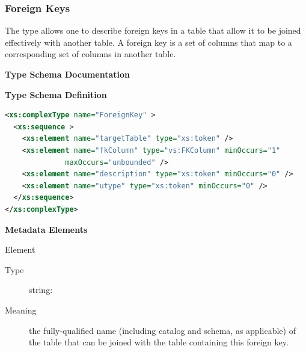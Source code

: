 \documentclass[11pt,a4paper]{ivoa}
\begin{document}
\subsubsection{Foreign Keys}
\label{sect:fkey}


The  type allows one to describe foreign
keys in a table that allow it to be joined effectively with another
table.  A foreign key is a set of columns that map to a corresponding
set of columns in another table.  


\begin{generated}
\begingroup
      	\renewcommand*\descriptionlabel[1]{%
      	\hbox to 5.5em{\emph{#1}\hfil}}\vspace{2ex}\noindent\textbf{ Type Schema Documentation}



\vspace{1ex}\noindent\textbf{ Type Schema Definition}

\begin{lstlisting}[language=XML,basicstyle=\footnotesize]
<xs:complexType name="ForeignKey" >
  <xs:sequence >
    <xs:element name="targetTable" type="xs:token" />
    <xs:element name="fkColumn" type="vs:FKColumn" minOccurs="1"
              maxOccurs="unbounded" />
    <xs:element name="description" type="xs:token" minOccurs="0" />
    <xs:element name="utype" type="xs:token" minOccurs="0" />
  </xs:sequence>
</xs:complexType>
\end{lstlisting}

\vspace{0.5ex}\noindent\textbf{ Metadata Elements}

\begingroup\small\begin{bigdescription}\item[Element \xmlel{targetTable}]
\begin{description}
\item[Type] string: 
\item[Meaning] 
               the fully-qualified name (including catalog and schema, as
               applicable) of the table that can be joined with the 
               table containing this foreign key.
             

\end{description}
\end{bigdescription}
\end{generated}
\end{document}
